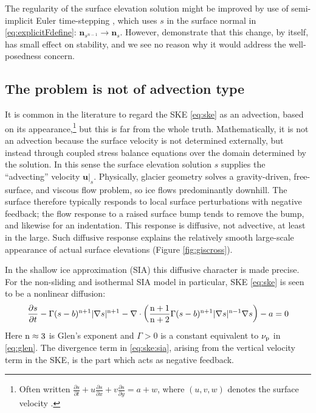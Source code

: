 \documentclass[hidelinks,onefignum,onetabnum,final]{siamart220329}  %
\newcommand{\grad}{\nabla}
\newcommand{\Div}{\nabla\cdot}
\newcommand{\bn}{\mathbf{n}}
\newcommand{\bu}{\mathbf{u}}
\newcommand{\nn}{{\text{\textnormal{n}}}}
\newcommand{\pp}{{\text{\textnormal{p}}}}
\begin{document}
The regularity of the surface elevation solution might be improved by use of semi-implicit Euler time-stepping  \cite{LofgrenAhlkronaHelanow2022}, which uses $s$ in the surface normal in \eqref{eq:explicitFdefine}: $\bn_{s^{n-1}} \to \bn_s$.  However, \cite{LofgrenAhlkronaHelanow2022} demonstrate that this change, by itself, has small effect on stability, and we see no reason why it would address the well-posedness concern.

\subsection{The problem is not of advection type} \label{subsec:notadv}  It is common in the literature to regard the SKE \eqref{eq:ske} as an advection, based on its appearance,\footnote{Often written $\frac{\partial s}{\partial t} + u \frac{\partial s}{\partial x} + v \frac{\partial s}{\partial y} = a + w$, where $(u,v,w)$ denotes the surface velocity \cite{GreveBlatter2009,SchoofHewitt2013}.} but this is far from the whole truth.  Mathematically, it is not an advection because the surface velocity is not determined externally, but instead through coupled stress balance equations over the domain determined by the solution.  In this sense the surface elevation solution $s$ supplies the ``advecting'' velocity $\bu|_s$.  Physically, glacier geometry solves a gravity-driven, free-surface, and viscous flow problem, so ice flows predominantly downhill.  The surface therefore typically responds to local surface perturbations with negative feedback; the flow response to a raised surface bump tends to remove the bump, and likewise for an indentation.  This response is diffusive, not advective, at least in the large.  Such diffusive response explains the relatively smooth large-scale appearance of actual surface elevations (Figure \ref{fig:giscross}).

In the shallow ice approximation (SIA) this diffusive character is made precise.  For the non-sliding and isothermal SIA model \cite{GreveBlatter2009,JouvetBueler2012} in particular, SKE \eqref{eq:ske} is seen to be a nonlinear diffusion:
\begin{equation}
\frac{\partial s}{\partial t} - \Gamma (s-b)^{\nn+1} |\grad s|^{\nn+1} - \Div \left(\frac{\nn+1}{\nn+2} \Gamma (s-b)^{\nn+1} |\grad s|^{\nn-1} \grad s\right) - a = 0  \label{eq:ske:sia}
\end{equation}
Here $\nn\approx 3$ is Glen's exponent \cite{GreveBlatter2009} and $\Gamma>0$ is a constant equivalent to $\nu_\pp$ in \eqref{eq:glen}.  The divergence term in \eqref{eq:ske:sia}, arising from the vertical velocity term in the SKE, is the part which acts as negative feedback.
\end{document}
